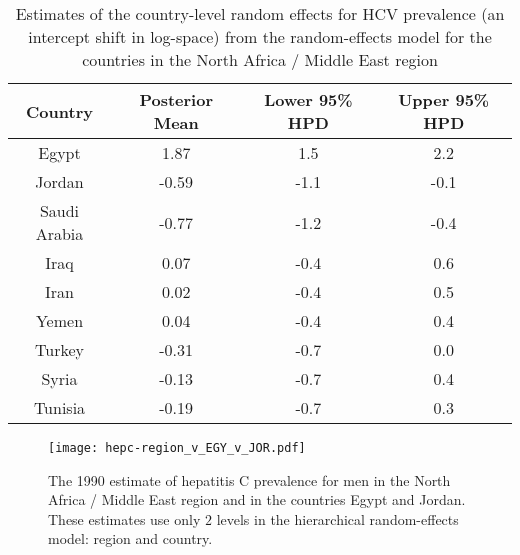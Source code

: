     \begin{table}[h]
        \begin{center}
        \begin{tabular}{|c|c|c|c|}
            \hline
                Country & Posterior Mean & Lower 95\% HPD  & Upper 95\%  HPD \\
            \hline
                Egypt	&	1.87	&	 1.5	&	2.2	\\
                Jordan	&	-0.59	&	-1.1	&	-0.1 \\
                Saudi Arabia	&	-0.77	&	-1.2	&	-0.4 \\
                Iraq	&	0.07	&	-0.4	&	0.6	\\
                Iran	&	0.02	&	-0.4	&	0.5	\\
                Yemen	&	0.04	&	-0.4	&	0.4	\\
                Turkey	&	-0.31	&	-0.7	&	0.0	\\
                Syria	&	-0.13	&	-0.7	&	0.4	\\
                Tunisia	&	-0.19	&	-0.7	&	0.3	\\
            \hline
        \end{tabular}
        \end{center}
        \caption{ Estimates of the country-level random effects for HCV
          prevalence (an intercept shift in log-space) from the random-effects
          model for the countries in the North Africa / Middle
          East region}
        \label{tab:app-hepc regional rfx}
    \end{table}

    \begin{figure}[h]
        \begin{center}
            \texttt{[image: hepc-region\_v\_EGY\_v\_JOR.pdf]}
            \caption{The 1990 estimate of hepatitis C prevalence for
              men in the North Africa / Middle East region and in 
              the countries Egypt and Jordan.  These estimates
              use only $2$ levels in the hierarchical random-effects
              model: region and country.}
            \label{fig:app-hepc regional rfx}
        \end{center}
    \end{figure}

